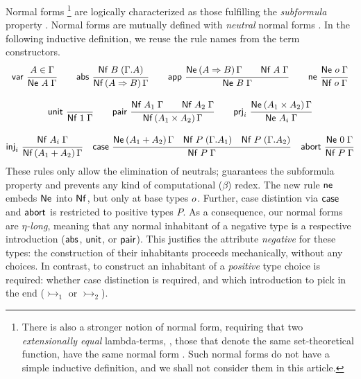 \documentclass[a4paper,USenglish,cleveref, autoref]{lipics-v2019}
\begin{document}
Normal forms%
\footnote{%
There is also a stronger
notion of normal form, requiring that two \emph{extensionally equal}
lambda-terms, \ie, those that denote the
same set-theoretical function, have the same normal form
\cite{mitchell:foundations,altenkirchDybjerHofmannScott:lics01,scherer:popl17}.
Such normal forms do not have a simple inductive definition, and we
shall not consider them in this article.
}
are logically characterized as those fulfilling the
\emph{subformula} property \cite{prawitz:natded,matthes:shortproofs}.
Normal forms  are mutually defined with
\emph{neutral} normal forms .
In the following inductive definition, we reuse the rule names from the
term constructors.
\begin{gather*}
  \nru{\tvar}{A \in \Gamma}{\Ne A \Gamma}
\qquad
  \nru{\tabs}{\NfC B {\cext \Gamma A}}{\NfP {A \To B} \Gamma}
\qquad
  \nru{\tapp}
    {\NeP {A \To B} \Gamma \qquad \Nf A \Gamma}
    {\Ne B \Gamma}
\qquad
  \nru{\tne}{\Ne \tybase \Gamma}{\Nf \tybase \Gamma}
\\[2ex]
  \nru{\tunit}{}{\Nf \tyone \Gamma}
\qquad
  \nru{\tpair}
    {\Nf {A_1} \Gamma \qquad \Nf {A_2} \Gamma}
    {\NfP {A_1 \times A_2} \Gamma}
\qquad
  \nru{\tprj_i}
    {\NeP {A_1 \times A_2} \Gamma}
    {\Ne {A_i} \Gamma}
\\[2ex]
  \nru{\tinj_i}
    {\Nf {A_i} \Gamma}
    {\NfP {A_1 + A_2} \Gamma}
\quad
  \nru{\tcase}
    {\NeP {A_1 + A_2} \Gamma
      \quad \NfC P {\cext \Gamma A_1}
      \quad \NfC P {\cext \Gamma A_2}
    }{\Nf P \Gamma}
\quad
  \nru{\tabort}
    {\Ne \tyzero \Gamma}
    {\Nf P \Gamma}
\end{gather*}
These rules only allow the elimination of neutrals; guarantees
the subformula property and prevents any kind of computational
($\beta$) redex.
The new rule $\mathsf{ne}$ embeds $\mathsf{Ne}^{}$ into $\mathsf{Nf}$,
but only at base types $o$.
Further, case distintion via $\mathsf{case}$ and $\mathsf{abort}$
is restricted to positive types $P$.
As a consequence, our normal forms are
\emph{$\eta$-long}, meaning that any normal inhabitant of a negative
type is a respective introduction ($\mathsf{abs}$, $\mathsf{unit}$, or $\mathsf{pair}$).
This justifies the attribute \emph{negative} for these types:
the construction of their inhabitants proceeds mechanically, without
any choices.  In contrast, to construct an inhabitant of a
\emph{positive} type choice is required: whether case distinction is
required, and which introduction to pick in the end ($\tinj_1$ or $\tinj_2$).
\end{document}
